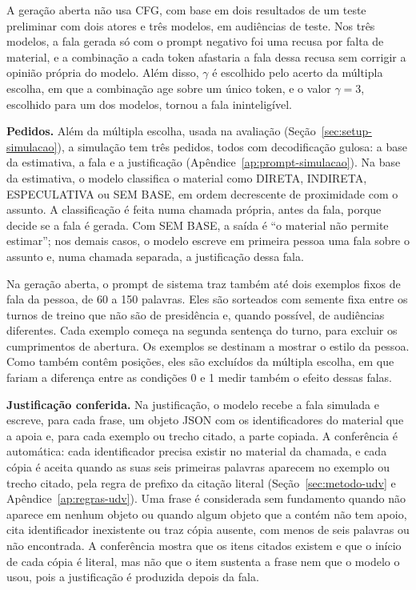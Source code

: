 A geração aberta não usa CFG, com base em dois resultados de um teste preliminar com dois atores e
três modelos, em audiências de teste. Nos três modelos, a fala gerada só com o prompt negativo foi uma
recusa por falta de material, e a combinação a cada token afastaria a fala dessa recusa sem corrigir
a opinião própria do modelo. Além disso, $\gamma$ é escolhido pelo acerto da múltipla escolha, em que
a combinação age sobre um único token, e o valor $\gamma = 3$, escolhido para um dos modelos, tornou
a fala ininteligível.

\textbf{Pedidos.} Além da múltipla escolha, usada na avaliação (Seção~\ref{sec:setup-simulacao}), a
simulação tem três pedidos, todos com decodificação gulosa: a base da estimativa, a fala e a
justificação (Apêndice~\ref{ap:prompt-simulacao}). Na base da estimativa, o modelo classifica o
material como DIRETA, INDIRETA, ESPECULATIVA ou SEM BASE, em ordem decrescente de proximidade com o
assunto. A classificação é feita numa chamada própria, antes da fala, porque decide se a fala é
gerada. Com SEM BASE, a saída é ``o material não permite estimar''; nos demais casos, o modelo
escreve em primeira pessoa uma fala sobre o assunto e, numa chamada separada, a justificação dessa
fala.

Na geração aberta, o prompt de sistema traz também até dois exemplos fixos de fala da pessoa, de 60 a
150 palavras. Eles são sorteados com semente fixa entre os turnos de treino que não são de presidência
e, quando possível, de audiências diferentes. Cada exemplo começa na segunda sentença do turno, para
excluir os cumprimentos de abertura. Os exemplos se destinam a mostrar o estilo da pessoa. Como
também contêm posições, eles são excluídos da múltipla escolha, em que fariam a diferença entre as
condições 0 e 1 medir também o efeito dessas falas.

\textbf{Justificação conferida.} Na justificação, o modelo recebe a fala simulada e escreve, para
cada frase, um objeto JSON com os identificadores do material que a apoia e, para cada exemplo ou
trecho citado, a parte copiada. A conferência é automática: cada identificador precisa existir no
material da chamada, e cada cópia é aceita quando as suas seis primeiras palavras aparecem no
exemplo ou trecho citado, pela regra de prefixo da citação literal (Seção~\ref{sec:metodo-udv} e
Apêndice~\ref{ap:regras-udv}). Uma frase é considerada sem fundamento quando não aparece em nenhum
objeto ou quando algum objeto que a contém não tem apoio, cita identificador inexistente ou traz
cópia ausente, com menos de seis palavras ou não encontrada. A conferência mostra que os itens
citados existem e que o início de cada cópia é literal, mas não que o item sustenta a frase nem que
o modelo o usou, pois a justificação é produzida depois da fala.
